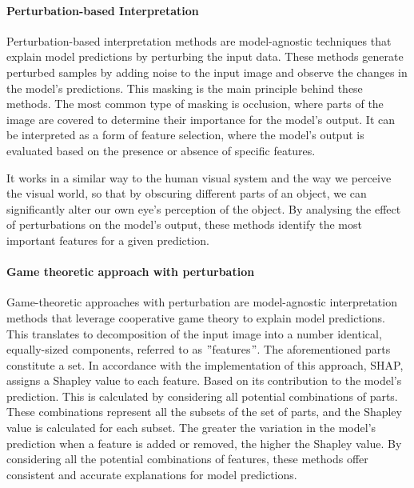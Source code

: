 \paragraph{Perturbation-based Interpretation}\label{par:pertubation-based-interpretation}

Perturbation-based interpretation methods are model-agnostic techniques that explain model predictions by perturbing the input data.
These methods generate perturbed samples by adding noise to the input image and observe the changes in the model's predictions.
This masking is the main principle behind these methods.
The most common type of masking is occlusion, where parts of the image are covered to determine their importance for the model's output.
It can be interpreted as a form of feature selection, where the model's output is evaluated based on the presence or absence of specific features.

It works in a similar way to the human visual system and the way we perceive the visual world,
so that by obscuring different parts of an object, we can significantly alter our own eye's perception of the object.
By analysing the effect of perturbations on the model's output, these methods identify the most important features for a given prediction.

\paragraph{Game theoretic approach with perturbation}\label{par:game-theoretic-approach-with-pertubation}

Game-theoretic approaches with perturbation are model-agnostic interpretation methods that leverage cooperative game theory to explain model predictions.
This translates to decomposition of the input image into a number identical, equally-sized components, referred to as \("\)features\("\).
The aforementioned parts constitute a set.
In accordance with the implementation of this approach, SHAP, assigns a Shapley value to each feature.
Based on its contribution to the model's prediction.
This is calculated by considering all potential combinations of parts.
These combinations represent all the subsets of the set of parts, and the Shapley value is calculated for each subset.
The greater the variation in the model's prediction when a feature is added or removed, the higher the Shapley value.
By considering all the potential combinations of features, these methods offer consistent and accurate explanations for model predictions.


